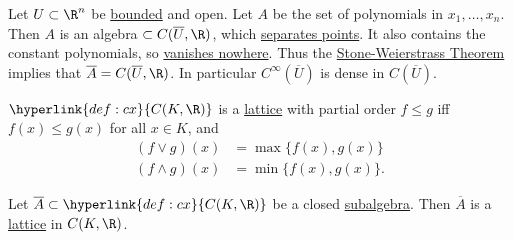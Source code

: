 \documentclass{article}
\begin{document}

\begin{eg}
    Let $U \subset \R^n$ be \hyperlink{def:boundedSubs}{bounded} and open.
    Let $A$ be the set of polynomials in $x_1, \dotsc, x_n$.
    Then $A$ is an algebra $\subset C(\overline{U}, \R)$, which \hyperlink{def:sep}{separates points}. It also contains the constant polynomials, so \hyperlink{def:vanish}{vanishes nowhere}.
    Thus the \hyperlink{thm:sw}{Stone-Weierstrass Theorem} implies that $\overline{A} = C(\overline{U}, \R)$.  In particular $C^\infty(\overline{U})$ is dense in $C(\overline{U})$.
\end{eg}


\begin{eg}
    $\hyperlink{def:cx}{C(K, \R)}$ is a \hyperlink{def:lattice}{lattice} with partial order $f \leq g$ iff $f(x) \leq g(x)$ for all $x \in K$, and
    \begin{align*}
        (f \vee g)(x) &= \max\{f(x), g(x)\} \\
        (f \wedge g)(x) &= \min\{f(x), g(x)\}.
    \end{align*}
\end{eg}

\begin{lemma}
    Let $\overline{A} \subset \hyperlink{def:cx}{C(K, \R)}$ be a closed \hyperlink{def:alg}{subalgebra}.
    Then $\overline{A}$ is a \hyperlink{def:lattice}{lattice} in $C(K, \R)$.
\end{lemma}
\end{document}
